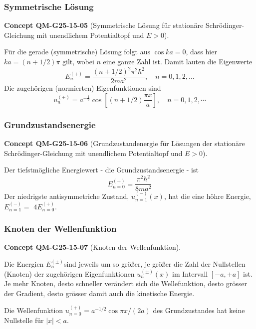 \documentclass[10pt, letterpaper]{article}
\newcommand{\CustomHeading}[3]{%
  \par\medskip\noindent%
  \textbf{#1 #2} \textnormal{(#3)}.\enskip%
}
\newenvironment{CONC}[2]{\begin{unitbox}\CustomHeading{Concept}{#1}{#2}}{\end{unitbox}}
\begin{document}
\subsubsection*{Symmetrische Lösung}

\begin{CONC}{QM-G25-15-05}{Symmetrische Lösung für stationäre Schrödinger-Gleichung mit unendlichem Potentialtopf und $E>0$}
Für die gerade (symmetrische) Lösung folgt aus $\cos k a=0$, dass hier $k a=(n+1 / 2) \pi$ gilt, wobei $n$ eine ganze Zahl ist. Damit lauten die Eigenwerte
$$
E_{n}^{(+)}=\frac{(n+1 / 2)^{2} \pi^{2} \hbar^{2}}{2 m a^{2}}, \quad n=0,1,2, \ldots
$$
Die zugehörigen (normierten) Eigenfunktionen sind
$$
u_{n}^{(+)}=a^{-\frac{1}{2}} \cos \left[(n+1 / 2) \frac{\pi x}{a}\right], \quad n=0,1,2, \cdots
$$
\end{CONC}


\subsubsection*{Grundzustandsenergie}


\begin{CONC}{QM-G25-15-06}{Grundzustandenergie für Lösungen der stationäre Schrödinger-Gleichung mit unendlichem Potentialtopf und $E>0$}
Der tiefstmögliche Energiewert - die Grundzustandsenergie - ist
$$
E_{n=0}^{(+)}=\frac{\pi^{2} \hbar^{2}}{8 m a^{2}}
$$
Der niedrigste antisymmetriche Zustand, $u_{n=1}^{(-)}(x)$, hat die eine höhre Energie, $E_{n=1}^{(-)}=$ $4 E_{n=0}^{(+)}$.
\end{CONC}


\subsubsection*{Knoten der Wellenfunktion}

\begin{CONC}{QM-G25-15-07}{Knoten der Wellenfunktion}
Die Energien $E_{n}^{( \pm)}$sind jeweils um so größer, je größer die Zahl der Nullstellen (Knoten) der zugehörigen Eigenfunktionen $u_{n}^{( \pm)}(x)$ im Intervall $[-a,+a]$ ist. Je mehr Knoten, desto schneller verändert sich die Wellefunktion, desto grösser der Gradient, desto grösser damit auch die kinetische Energie.

Die Wellenfunktion $u_{n=0}^{(+)}=a^{-1 / 2} \cos \pi x /(2 a)$ des Grundzustandes hat keine Nullstelle für $|x|<a$.
\end{CONC}
\end{document}
